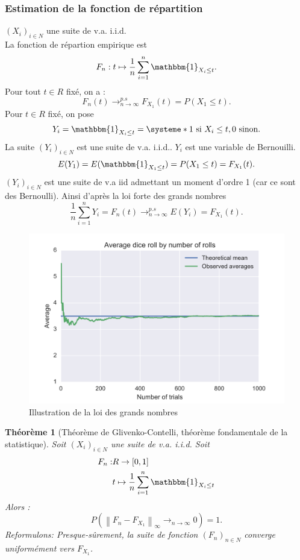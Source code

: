\documentclass{article}
\theoremstyle{plain}%
\newtheorem{thm}{Théorème}[section]
\theoremstyle{definition}
\theoremstyle{remark}
\begin{document}
\subsubsection{Estimation de la fonction de répartition}
$ (X_i)_{i \in N} $ une suite de v.a. i.i.d. \\
La fonction de répartion empirique est 
\[
    F_n: t \mapsto \frac{1}{n}\sum_{i=1}^{n} \mathbbm{1}_{X_i \leq t}
.\]
Pour tout $ t \in R $ fixé, on a : 
\[
    F_n(t) \to ^{p.s}_{n \to \infty } F_{X_1}(t) = P(X_1 \leq t)
.\]
Pour $ t \in R$  fixé, on pose 
\[
    Y_i = \mathbbm{1}_{X_i \leq t} = \systeme*{
        1 \text{ si } X_i \leq t,
        0 \text{ sinon}
    }
.\]
La suite $ (Y_i)_{i \in N} $ est une suite de v.a. i.i.d.. $ Y_i $ est une variable de Bernouilli. 
\[
    E(Y_1) = E(\mathbbm{1}_{X_1 \leq t}) = P(X_1 \leq t) = F_{X_1}(t)
.\]
$ (Y_i)_{i \in N} $ est une suite de v.a iid admettant un moment d'ordre 1 (car ce sont des Bernoulli). Ainsi d'après la loi forte des grands nombres 
\[
    \frac{1}{n}\sum_{i=1}^{n}Y_i = F_n(t) \to ^{p.s}_{n \to \infty } E(Y_i) = F_{X_1}(t)
.\]

\begin{figure}[hbp]
    \centering
    \includegraphics[width=.8\textwidth]{figures/figure1.png}
    \caption{Illustration de la loi des grands nombres}
\end{figure}

\begin{thm}[Théorème de Glivenko-Contelli, théorème fondamentale de la statistique]
    Soit $ (X_i)_{i \in N} $ une suite de v.a. i.i.d. Soit \begin{align*}
        F_n :& R \to [0,1] \\
            & t \mapsto \frac{1}{n}\sum_{i=1}^{n}\mathbbm{1}_{X_i \leq t}
    \end{align*}
    Alors :
    \[
        P(\left\| F_n - F_{X_1} \right\|_{\infty } \to _{n \to \infty } 0 ) = 1
    .\]
    Reformulons: Presque-sûrement, la suite de fonction $ (F_n)_{n \in N} $ converge uniformément vers $ F_{X_1} $.
\end{thm}
\end{document}
